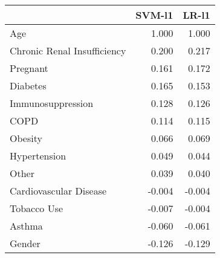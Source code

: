 \begin{tabular}{lrr}
\toprule
{} &  SVM-l1 &  LR-l1 \\
\midrule
Age                         &   1.000 &  1.000 \\
Chronic Renal Insufficiency &   0.200 &  0.217 \\
Pregnant                    &   0.161 &  0.172 \\
Diabetes                    &   0.165 &  0.153 \\
Immunosuppression           &   0.128 &  0.126 \\
COPD                        &   0.114 &  0.115 \\
Obesity                     &   0.066 &  0.069 \\
Hypertension                &   0.049 &  0.044 \\
Other                       &   0.039 &  0.040 \\
Cardiovascular Disease      &  -0.004 & -0.004 \\
Tobacco Use                 &  -0.007 & -0.004 \\
Asthma                      &  -0.060 & -0.061 \\
Gender                      &  -0.126 & -0.129 \\
\bottomrule
\end{tabular}
